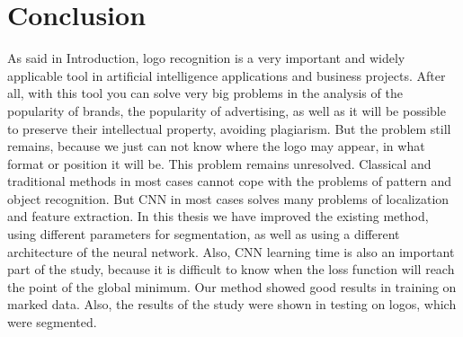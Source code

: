 
\section{Conclusion}\label{sec:6.1}
\vspace{-0.5cm}
\noindent As said in Introduction, logo recognition is a very important and widely applicable tool in artificial intelligence applications and business projects. After all, with this tool you can solve very big problems in the analysis of the popularity of brands, the popularity of advertising, as well as it will be possible to preserve their intellectual property, avoiding plagiarism. But the problem still remains, because we just can not know where the logo may appear, in what format or position it will be. This problem remains unresolved. Classical and traditional methods in most cases cannot cope with the problems of pattern and object recognition. But CNN in most cases solves many problems of localization and feature extraction. In this thesis we have improved the existing method, using different parameters for segmentation, as well as using a different architecture of the neural network. Also, CNN learning time is also an important part of the study, because it is difficult to know when the loss function will reach the point of the global minimum. Our method showed good results in training on marked data. Also, the results of the study were shown in testing on logos, which were segmented.